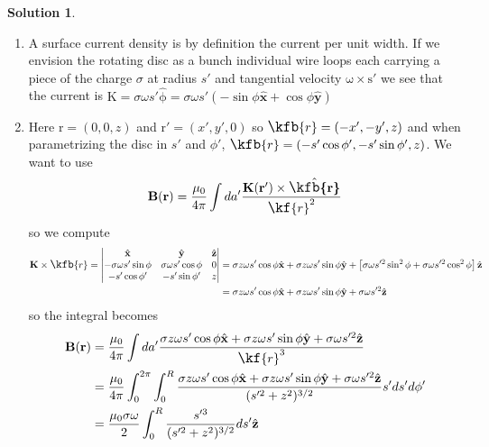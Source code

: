 \documentclass[10pt]{article}
\theoremstyle{definition}
\newtheorem{soln}{Solution}
\newcommand{\ux}{\hat{\mathbf{x}}}
\newcommand{\uy}{\hat{\mathbf{y}}}
\newcommand{\uz}{\hat{\mathbf{z}}}
\newcommand{\uv}[1]{\hat{\bv{{#1}}}}
\newcommand{\scriptr}{\fontsize{12pt}{12pt}\kf{r}\fontsize{10pt}{10pt}}
\newcommand{\bscriptr}{\fontsize{12pt}{12pt}\kfb{r}\fontsize{10pt}{10pt}}
\newcommand{\bv}[1]{\bm{\mathrm{#1}}}
\begin{document}
\begin{soln}~
  \begin{enumerate}[label=(\alph*)]
    \item A surface current density is by definition the current per unit width. If we envision the rotating disc as a bunch individual
          wire loops each carrying a piece of the charge $\sigma$ at radius $s'$ and tangential velocity $\bv{\omega}\times \bv{s'}$ we see that the current is
          $\bv{K}=\sigma \omega s'\uv{\phi}=\sigma \omega s'\left(-\sin\phi\ux+\cos\phi\uy\right)$
    \item Here $\bv{r}=(0,0,z)$ and $\bv{r}'=(x',y',0)$ so $\bscriptr=(-x',-y',z)$ and when parametrizing the disc in $s'$ and $\phi'$, $\bscriptr=(-s'\cos\phi',-s'\sin\phi', z)$.
          We want to use
          $$\bv{B}(\bv{r})=\frac{\mu_0}{4\pi}\int da' \frac{\bv{K}(\bv{r}')\times \uv{\bscriptr}}{\scriptr^2}$$
          so we compute
          \begin{align*}
            \bv{K}\times \bscriptr =\begin{vmatrix}
                                      \ux                       & \uy                      & \uz \\
                                      -\sigma \omega s'\sin\phi & \sigma \omega s'\cos\phi & 0   \\
                                      -s'\cos\phi'              & -s'\sin\phi'             & z
                                    \end{vmatrix}
             & =\sigma z\omega s'\cos\phi\ux+\sigma z \omega s'\sin\phi\uy + \left[\sigma \omega s'^2\sin^2\phi+\sigma \omega s'^2\cos^2\phi\right]\uz \\
             & =\sigma z\omega s'\cos\phi\ux+\sigma z \omega s'\sin\phi\uy + \sigma \omega s'^2\uz
          \end{align*}
          so the integral becomes
          \begin{align*}
            \bv{B}(\bv{r}) & =\frac{\mu_0}{4\pi}\int da' \frac{\sigma z\omega s'\cos\phi\ux+\sigma z \omega s'\sin\phi\uy + \sigma \omega s'^2\uz}{\scriptr^3}                                     \\
                           & =\frac{\mu_0}{4\pi}\int_{0}^{2\pi}\int_{0}^{R} \frac{\sigma z\omega s'\cos\phi\ux+\sigma z \omega s'\sin\phi\uy + \sigma \omega s'^2\uz}{(s'^2+z^2)^{3/2}}s'ds'd\phi' \\
                           & =\frac{\mu_0 \sigma \omega }{2}\int_{0}^{R} \frac{s'^3}{(s'^2+z^2)^{3/2}}ds'\uz

\end{align*}
\end{enumerate}
\end{soln}
\end{document}
